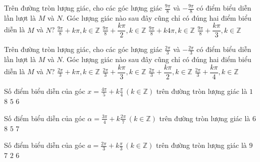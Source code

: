 \documentclass[12pt,a4paper]{article}
\begin{document}
\begin{ex}
 Trên đường tròn lượng giác, cho các góc lượng giác ${\frac{9 \pi}{8}}$ và ${- \frac{9 \pi}{8}}$ có điểm biểu diễn lần lượt là ${M}$ và ${N}$. Góc lượng giác nào sau đây cũng chỉ có đúng hai điểm biểu diễn là ${M}$ và ${N}$? 
\choice
{ \True $\frac{9 \pi}{8}+k\pi, k\in \mathbb{Z}$ }
   { $\frac{9 \pi}{8}+\dfrac{k\pi }{2}, k\in \mathbb{Z}$ }
     { $\frac{9 \pi}{8}+k4\pi, k\in \mathbb{Z}$ }
    { $\frac{9 \pi}{8}+\dfrac{k\pi }{3}, k\in \mathbb{Z}$ }
\end{ex}

\begin{ex}
 Trên đường tròn lượng giác, cho các góc lượng giác ${\frac{2 \pi}{3}}$ và ${- \frac{2 \pi}{3}}$ có điểm biểu diễn lần lượt là ${M}$ và ${N}$. Góc lượng giác nào sau đây cũng chỉ có đúng hai điểm biểu diễn là ${M}$ và ${N}$? 
\choice
{ \True $\frac{2 \pi}{3}+k\pi, k\in \mathbb{Z}$ }
   { $\frac{2 \pi}{3}+\dfrac{k\pi }{3}, k\in \mathbb{Z}$ }
     { $\frac{2 \pi}{3}+\dfrac{k\pi }{2}, k\in \mathbb{Z}$ }
    { $\frac{2 \pi}{3}+\dfrac{k\pi }{4}, k\in \mathbb{Z}$ }
\end{ex}

\begin{ex}
 Số điểm biểu diễn của góc $x=\frac{4 \pi}{5}+k\frac{\pi}{4}\, (k\in \mathbb{Z})$ trên đường tròn lượng giác là 
\choice
{ ${1}$ }
   { \True ${8}$ }
     { ${5}$ }
    { ${6}$ }
\end{ex}

\begin{ex}
 Số điểm biểu diễn của góc $\alpha=\frac{3 \pi}{4}+k\frac{2 \pi}{7}\, (k\in \mathbb{Z})$ trên đường tròn lượng giác là 
\choice
{ ${6}$ }
   { ${8}$ }
     { ${5}$ }
    { \True ${7}$ }
\end{ex}

\begin{ex}
 Số điểm biểu diễn của góc $a=\frac{2 \pi}{3}+k\frac{\pi}{3}\, (k\in \mathbb{Z})$ trên đường tròn lượng giác là 
\choice
{ ${9}$ }
   { ${7}$ }
     { ${2}$ }
    { \True ${6}$ }
\end{ex}
\end{document}
